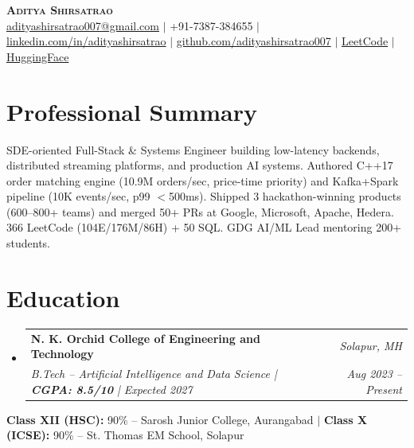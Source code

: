 \documentclass[letterpaper,10pt]{article}
\makeatletter
\newcommand{\resumeSubheading}[4]{
  \vspace{-2pt}\item
    \begin{tabular*}{0.97\textwidth}[t]{l@{\extracolsep{\fill}}r}
      \textbf{#1} & \textit{\small #2} \\
      \textit{\small#3} & \textit{\small #4}
    \end{tabular*}\vspace{-5pt}
}
\newcommand{\resumeSubHeadingListStart}{\begin{itemize}[leftmargin=0.15in, label={}]}
\newcommand{\resumeSubHeadingListEnd}{\end{itemize}\vspace{-2pt}}
\makeatother
\begin{document}
\begin{center}
  {\Huge\textbf{\scshape Aditya Shirsatrao}} \\ \vspace{2pt}
  \small
  \href{mailto:adityashirsatrao007@gmail.com}{adityashirsatrao007@gmail.com} \hspace{4pt}$|$\hspace{4pt}
  +91-7387-384655 \hspace{4pt}$|$\hspace{4pt}
  \href{https://www.linkedin.com/in/adityashirsatrao/}{linkedin.com/in/adityashirsatrao} \hspace{4pt}$|$\hspace{4pt}
  \href{https://github.com/adityashirsatrao007}{github.com/adityashirsatrao007} \hspace{4pt}$|$\hspace{4pt}
  \href{https://leetcode.com/u/adityashirsatrao007/}{LeetCode} \hspace{4pt}$|$\hspace{4pt}
  \href{https://huggingface.co/adityashirsatrao007}{HuggingFace}
\end{center}

\section{Professional Summary}
\small{SDE-oriented Full-Stack \& Systems Engineer building low-latency backends, distributed streaming platforms, and production AI systems. Authored C++17 order matching engine (10.9M orders/sec, price-time priority) and Kafka+Spark pipeline (10K events/sec, p99 $<$500ms). Shipped 3 hackathon-winning products (600--800+ teams) and merged 50+ PRs at Google, Microsoft, Apache, Hedera. 366 LeetCode (104E/176M/86H) + 50 SQL. GDG AI/ML Lead mentoring 200+ students.}

\section{Education}
\resumeSubHeadingListStart
\resumeSubheading
  {N. K. Orchid College of Engineering and Technology}{Solapur, MH}
  {B.Tech -- Artificial Intelligence and Data Science \hspace{4pt}|\hspace{4pt} \textbf{CGPA: 8.5/10} \hspace{4pt}|\hspace{4pt} Expected 2027}{Aug 2023 -- Present}
\resumeSubHeadingListEnd
\vspace{-4pt}
\small{\textbf{Class XII (HSC):} 90\% -- Sarosh Junior College, Aurangabad \hspace{6pt}$|$\hspace{6pt} \textbf{Class X (ICSE):} 90\% -- St. Thomas EM School, Solapur}\vspace{2pt}
\end{document}
